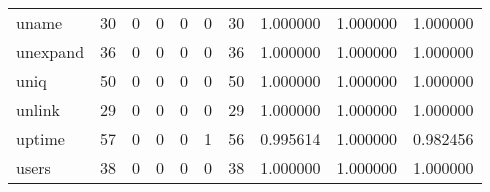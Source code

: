 \begin{tabular}{lrrrrrrrrr}
uname     &                                        30 &                                                  0 &                                                  0 &                                                  0 &                                                  0 &                                                 30 &                                           1.000000 &                               1.000000 &                             1.000000 \\
unexpand  &                                        36 &                                                  0 &                                                  0 &                                                  0 &                                                  0 &                                                 36 &                                           1.000000 &                               1.000000 &                             1.000000 \\
uniq      &                                        50 &                                                  0 &                                                  0 &                                                  0 &                                                  0 &                                                 50 &                                           1.000000 &                               1.000000 &                             1.000000 \\
unlink    &                                        29 &                                                  0 &                                                  0 &                                                  0 &                                                  0 &                                                 29 &                                           1.000000 &                               1.000000 &                             1.000000 \\
uptime    &                                        57 &                                                  0 &                                                  0 &                                                  0 &                                                  1 &                                                 56 &                                           0.995614 &                               1.000000 &                             0.982456 \\
users     &                                        38 &                                                  0 &                                                  0 &                                                  0 &                                                  0 &                                                 38 &                                           1.000000 &                               1.000000 &                             1.000000 \\

\end{tabular}
